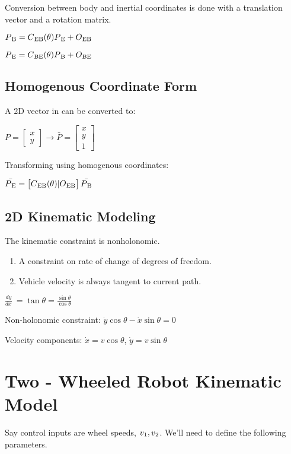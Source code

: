 \documentclass[titlepage, 12pt]{article}
\begin{document}
	Conversion between body and inertial coordinates is done with a translation vector and a rotation matrix.
	
	$P\textsubscript{B} = C\textsubscript{EB} (\theta) P\textsubscript{E} + O\textsubscript{EB}$

	$P\textsubscript{E} = C\textsubscript{BE} (\theta) P\textsubscript{B} + O\textsubscript{BE}$
	
	\subsection{Homogenous Coordinate Form}
	
	A 2D vector in can be converted to:
	
	$P = 
	\begin{bmatrix}
		x \\
		y
	\end{bmatrix}
	\rightarrow
	\bar{P} = 
	\begin{bmatrix}
		x \\
		y \\
		1
	\end{bmatrix}
	$
	
	Transforming using homogenous coordinates:
	
	$\bar{P\textsubscript{E}} = 
	\begin{bmatrix}
		C\textsubscript{EB}(\theta) | O\textsubscript{EB}
	\end{bmatrix}
	\bar{P\textsubscript{B}}
	$
	
	\subsection{2D Kinematic Modeling}
	
	The kinematic constraint is nonholonomic.
	\begin{enumerate}
		\item A constraint on rate of change of degrees of freedom.
		\item Vehicle velocity is always tangent to current path.
	\end{enumerate}

	$
	\frac{dy}{dx}\
	=
	\tan{\theta}
	=
	\frac{\sin{\theta}}{\cos{\theta}}
	$
	
	Non-holonomic constraint: $
	\dot{y}\cos{\theta}
	-
	\dot{x}\sin{\theta}
	= 0
	$
	
	Velocity components: $
	\dot{x}
	= v\cos{\theta} 
	$, 
	$ 
	\dot{y}
	= v\sin{\theta}
	$
	
	\section{Two - Wheeled Robot Kinematic Model}
	Say control inputs are wheel speeds, $v\textsubscript{1}, v\textsubscript{2}$.
	We'll need to define the following parameters.
	
\end{document}
